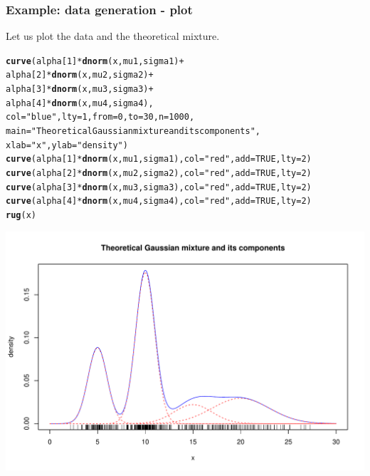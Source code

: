 \documentclass{beamer}\usepackage[]{graphicx}\usepackage[]{color}
\makeatletter
\newcommand{\hlnum}[1]{\textcolor[rgb]{0.686,0.059,0.569}{#1}}%
\newcommand{\hlstr}[1]{\textcolor[rgb]{0.192,0.494,0.8}{#1}}%
\newcommand{\hlopt}[1]{\textcolor[rgb]{0,0,0}{#1}}%
\newcommand{\hlstd}[1]{\textcolor[rgb]{0.345,0.345,0.345}{#1}}%
\newcommand{\hlkwc}[1]{\textcolor[rgb]{0.333,0.667,0.333}{#1}}%
\newcommand{\hlkwd}[1]{\textcolor[rgb]{0.737,0.353,0.396}{\textbf{#1}}}%
\newenvironment{kframe}{%
 \def\at@end@of@kframe{}%
 \ifinner\ifhmode%
  \def\at@end@of@kframe{\end{minipage}}%
  \begin{minipage}{\columnwidth}%
 \fi\fi%
 \def\FrameCommand##1{\hskip\@totalleftmargin \hskip-\fboxsep
 \colorbox{shadecolor}{##1}\hskip-\fboxsep
     \hskip-\linewidth \hskip-\@totalleftmargin \hskip\columnwidth}%
 \MakeFramed {\advance\hsize-\width
   \@totalleftmargin\z@ \linewidth\hsize
   \@setminipage}}%
 {\par\unskip\endMakeFramed%
 \at@end@of@kframe}
\newenvironment{knitrout}{}{} %
\makeatother
\begin{document}
\begin{frame}
  \frametitle{Example: data generation - plot}

Let us plot the data and the theoretical mixture.
\begin{knitrout}\scriptsize
{}\color{fgcolor}\begin{kframe}
\begin{alltt}
\hlkwd{curve}\hlstd{(alpha[}\hlnum{1}\hlstd{]}\hlopt{*}\hlkwd{dnorm}\hlstd{(x,mu1,sigma1)} \hlopt{+}
      \hlstd{alpha[}\hlnum{2}\hlstd{]}\hlopt{*}\hlkwd{dnorm}\hlstd{(x,mu2,sigma2)} \hlopt{+}
      \hlstd{alpha[}\hlnum{3}\hlstd{]}\hlopt{*}\hlkwd{dnorm}\hlstd{(x,mu3,sigma3)} \hlopt{+}
      \hlstd{alpha[}\hlnum{4}\hlstd{]}\hlopt{*}\hlkwd{dnorm}\hlstd{(x,mu4,sigma4),}
      \hlkwc{col}\hlstd{=}\hlstr{"blue"}\hlstd{,} \hlkwc{lty}\hlstd{=}\hlnum{1}\hlstd{,} \hlkwc{from}\hlstd{=}\hlnum{0}\hlstd{,}\hlkwc{to}\hlstd{=}\hlnum{30}\hlstd{,} \hlkwc{n}\hlstd{=}\hlnum{1000}\hlstd{,}
      \hlkwc{main}\hlstd{=}\hlstr{"Theoretical Gaussian mixture and its components"}\hlstd{,}
      \hlkwc{xlab}\hlstd{=}\hlstr{"x"}\hlstd{,} \hlkwc{ylab}\hlstd{=}\hlstr{"density"}\hlstd{)}
\hlkwd{curve}\hlstd{(alpha[}\hlnum{1}\hlstd{]}\hlopt{*}\hlkwd{dnorm}\hlstd{(x,mu1,sigma1),} \hlkwc{col}\hlstd{=}\hlstr{"red"}\hlstd{,} \hlkwc{add}\hlstd{=}\hlnum{TRUE}\hlstd{,} \hlkwc{lty}\hlstd{=}\hlnum{2}\hlstd{)}
\hlkwd{curve}\hlstd{(alpha[}\hlnum{2}\hlstd{]}\hlopt{*}\hlkwd{dnorm}\hlstd{(x,mu2,sigma2),} \hlkwc{col}\hlstd{=}\hlstr{"red"}\hlstd{,} \hlkwc{add}\hlstd{=}\hlnum{TRUE}\hlstd{,} \hlkwc{lty}\hlstd{=}\hlnum{2}\hlstd{)}
\hlkwd{curve}\hlstd{(alpha[}\hlnum{3}\hlstd{]}\hlopt{*}\hlkwd{dnorm}\hlstd{(x,mu3,sigma3),} \hlkwc{col}\hlstd{=}\hlstr{"red"}\hlstd{,} \hlkwc{add}\hlstd{=}\hlnum{TRUE}\hlstd{,} \hlkwc{lty}\hlstd{=}\hlnum{2}\hlstd{)}
\hlkwd{curve}\hlstd{(alpha[}\hlnum{4}\hlstd{]}\hlopt{*}\hlkwd{dnorm}\hlstd{(x,mu4,sigma4),} \hlkwc{col}\hlstd{=}\hlstr{"red"}\hlstd{,} \hlkwc{add}\hlstd{=}\hlnum{TRUE}\hlstd{,} \hlkwc{lty}\hlstd{=}\hlnum{2}\hlstd{)}
\hlkwd{rug}\hlstd{(x)}
\end{alltt}
\end{kframe}
\includegraphics[width=.8\textwidth]{figures/EM_mixture_example_data_plot-1} 

\end{knitrout}
\end{frame}
\end{document}
